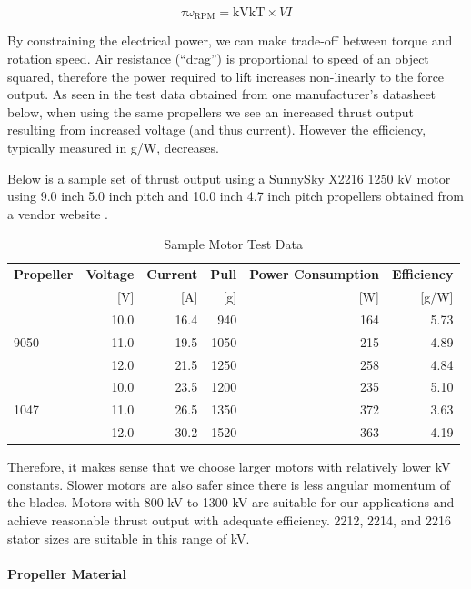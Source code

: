 $$
\tau\omega_{\mathrm{RPM}} = \mathrm{kV}\mathrm{kT}\times VI
$$

By constraining the electrical power, we can make trade-off between torque and rotation speed.
Air resistance (“drag”) is proportional to speed of an object squared, therefore the power required to 
lift increases non-linearly to the force output. As seen in the test data obtained from one manufacturer’s 
datasheet below, when using the same propellers we see an increased thrust output resulting from increased voltage (and 
thus current). However the efficiency, typically measured in g/W, decreases. 

Below is a sample set of thrust output using a SunnySky X2216 1250 kV motor using 9.0 inch 5.0 inch pitch and 10.0 inch 4.7 inch pitch propellers obtained from a vendor website \cite{sunnysky-2216}. 

\begin{table}[H]
    \centering
    \caption{Sample Motor Test Data}
    \label{table:sunnyskyx2216-table}

    \begin{tabular}{lrrrrr}

    \hline
    \textbf{Propeller} & \textbf{Voltage} & \textbf{Current} & \textbf{Pull}  & \textbf{Power Consumption} & \textbf{Efficiency}\\
    & [V] & [A] & [g] & [W] & [g/W] \\
    \hline
     & 10.0 & 16.4 & 940 & 164 & 5.73 \\
    9050 & 11.0 & 19.5 & 1050 & 215 & 4.89 \\
     & 12.0 & 21.5 & 1250 & 258 & 4.84 \\
    \hline
     & 10.0 & 23.5 & 1200 & 235 & 5.10 \\
    1047 & 11.0 & 26.5 & 1350 & 372 & 3.63 \\
     & 12.0 & 30.2 & 1520 & 363 & 4.19 \\
    \hline

    \end{tabular} 
\end{table}

Therefore, it makes sense that we choose larger motors with relatively lower kV constants. Slower motors 
are also safer since there is less angular momentum of the blades. Motors with 800 kV to 1300 kV are 
suitable for our applications and achieve reasonable thrust output with adequate efficiency. 2212, 2214, 
and 2216 stator sizes are suitable in this range of kV.

\paragraph{Propeller Material}

